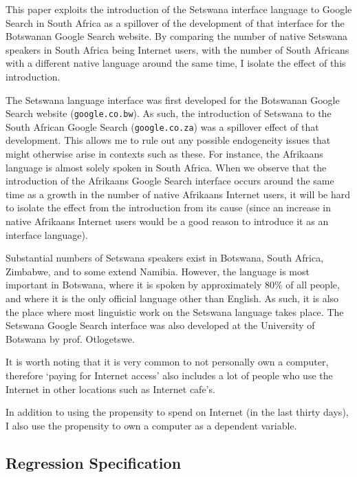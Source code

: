 \documentclass[a4paper,british]{article}\usepackage[]{graphicx}\usepackage[]{xcolor}
\providecommand*{\code}[1]{\texttt{#1}}
\begin{document}
\label{subsec:identification}This paper exploits the introduction
of the Setswana interface language to Google Search in South Africa
as a spillover of the development of that interface for the Botswanan
Google Search website. By comparing the number of native Setswana
speakers in South Africa being Internet users, with the number of
South Africans with a different native language around the same time,
I isolate the effect of this introduction.

The Setswana language interface was first developed for the Botswanan
Google Search website (\code{google.co.bw}). As such, the introduction
of Setswana to the South African Google Search (\code{google.co.za})
was a spillover effect of that development. This allows me to rule
out any possible endogeneity issues that might otherwise arise in
contexts such as these. For instance, the Afrikaans language is almost
solely spoken in South Africa. When we observe that the introduction
of the Afrikaans Google Search interface occurs around the same time
as a growth in the number of native Afrikaans Internet users, it will
be hard to isolate the effect from the introduction from its cause
(since an increase in native Afrikaans Internet users would be a good
reason to introduce it as an interface language).

Substantial numbers of Setswana speakers exist in Botswana, South
Africa, Zimbabwe, and to some extend Namibia. However, the language
is most important in Botswana, where it is spoken by approximately
80\% of all people, and where it is the only official language other
than English. As such, it is also the place where most linguistic
work on the Setswana language takes place. The Setswana Google Search
interface was also developed at the University of Botswana by prof.
Otlogetswe.

It is worth noting that it is very common to not personally own a
computer, therefore `paying for Internet access' also includes a lot
of people who use the Internet in other locations such as Internet
cafe's.

In addition to using the propensity to spend on Internet (in the last
thirty days), I also use the propensity to own a computer as a dependent
variable. 

\subsection{Regression Specification}
\end{document}
